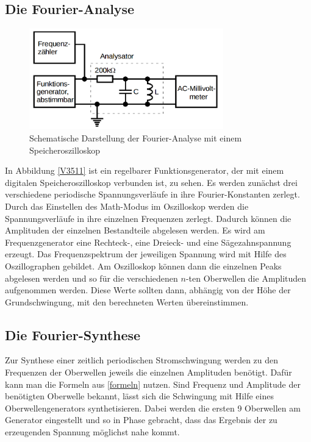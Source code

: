 \documentclass[
  bibliography=totoc,     %
  captions=tableheading,  %
  titlepage=firstiscover, %
]{scrartcl}
\begin{document}
\subsection{Die Fourier-Analyse}
\begin{figure}[htb]
  \centering
  \includegraphics[width=0.75\textwidth]{V3511.png}
  \caption{Schematische Darstellung der Fourier-Analyse mit einem Speicheroszilloskop}
\end{figure}
\label{V3511}
In Abbildung \ref{V3511} ist ein regelbarer Funktionsgenerator, der mit einem
digitalen Speicheroszilloskop verbunden ist, zu sehen. Es werden zunächst drei
verschiedene periodische Spannungsverläufe in ihre Fourier-Konstanten zerlegt.
Durch das Einstellen des Math-Modus im Oszilloskop werden die Spannungsverläufe
in ihre einzelnen Frequenzen zerlegt. Dadurch können die Amplituden der
einzelnen Bestandteile abgelesen werden. Es wird am Frequenzgenerator eine
Rechteck-, eine Dreieck- und eine Sägezahnspannung erzeugt. Das Frequenzspektrum
der jeweiligen Spannung wird mit Hilfe des Oszillographen gebildet. Am
Oszilloskop können dann die einzelnen Peaks abgelesen werden und so für die
verschiedenen $n$-ten Oberwellen die Amplituden aufgenommen werden. Diese Werte
sollten dann, abhängig von der Höhe der Grundschwingung, mit den berechneten
Werten übereinstimmen.
\subsection{Die Fourier-Synthese}
Zur Synthese einer zeitlich periodischen Stromschwingung werden zu den
Frequenzen der Oberwellen jeweils die einzelnen Amplituden benötigt. Dafür kann
man die Formeln aus \ref{formeln} nutzen. Sind Frequenz und Amplitude der
benötigten Oberwelle bekannt, lässt sich die Schwingung mit Hilfe eines
Oberwellengenerators synthetisieren. Dabei werden die ersten 9 Oberwellen am
Generator eingestellt und so in Phase gebracht, dass das Ergebnis der zu
erzeugenden Spannung möglichst nahe kommt.
\end{document}
